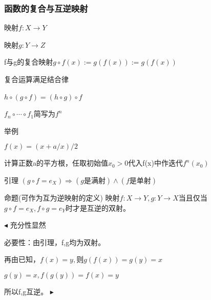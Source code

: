 \documentclass{article}
\begin{document}
	\subsubsection{函数的复合与互逆映射}
	映射$f:X\rightarrow Y$\par 
	映射$g:Y\rightarrow Z$\par 
	f与g的复合映射$g\circ f(x):=g(f(x)):=g(f(x))$
	~\\ \par
	复合运算满足结合律\par 
	$h\circ (g\circ f)=(h\circ g)\circ f$
	~\\ \par 
	$f_n\circ\cdots\circ f_1$简写为$f^n$
	~\\ \par 
	举例\par 
	$f(x)=(x+a/x)/2$\par 
	计算正数a的平方根，任取初始值$x_0>0$代入f(x)中作迭代$f^n(x_0)$
	~\\ \par 
	引理 \quad $(g\circ f=e_X)\Rightarrow (g\mbox{是满射})\wedge (f\mbox{是单射})$
	\par 命题(可作为互为逆映射的定义) \quad 映射$f:X\rightarrow Y,g:Y\rightarrow X$当且仅当$g\circ f=e_X,f\circ g=e_Y$时才是互逆的双射。
	\par $\blacktriangleleft$ 充分性显然\par 必要性：由引理，f,g均为双射。\par 再由已知，$f(x)=y,则g(f(x))=g(y)=x$\par $g(y)=x,f(g(y))=f(x)=y$\par 所以f,g互逆。 $\blacktriangleright$
\end{document}
